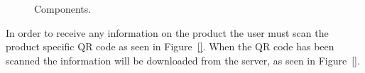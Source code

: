 	\begin{figure}[ht!]
		\centering
		\qquad
		\qquad
		\qquad
		\qquad
		\caption{Components.}
		\label{demoCaseRaw}
	\end{figure}

In order to receive any information on the product the user must scan the product specific QR code as seen in Figure~\ref{}. When the QR code has been scanned the information will be downloaded from the server, as seen in Figure~\ref{}. 

